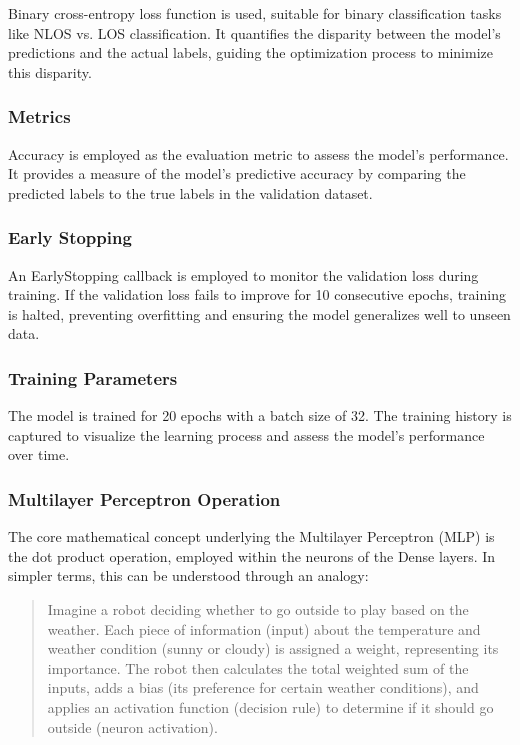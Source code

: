 Binary cross-entropy loss function is used, suitable for binary classification tasks like NLOS vs. LOS classification. It quantifies the disparity between the model's predictions and the actual labels, guiding the optimization process to minimize this disparity.

\subsubsection{Metrics}

Accuracy is employed as the evaluation metric to assess the model's performance. It provides a measure of the model's predictive accuracy by comparing the predicted labels to the true labels in the validation dataset.

\subsubsection{Early Stopping}

An EarlyStopping callback is employed to monitor the validation loss during training. If the validation loss fails to improve for 10 consecutive epochs, training is halted, preventing overfitting and ensuring the model generalizes well to unseen data.

\subsubsection{Training Parameters}

The model is trained for 20 epochs with a batch size of 32. The training history is captured to visualize the learning process and assess the model's performance over time.

\subsubsection{Multilayer Perceptron Operation}

The core mathematical concept underlying the Multilayer Perceptron (MLP) is the dot product operation, employed within the neurons of the Dense layers. In simpler terms, this can be understood through an analogy:

\begin{quote}
Imagine a robot deciding whether to go outside to play based on the weather. Each piece of information (input) about the temperature and weather condition (sunny or cloudy) is assigned a weight, representing its importance. The robot then calculates the total weighted sum of the inputs, adds a bias (its preference for certain weather conditions), and applies an activation function (decision rule) to determine if it should go outside (neuron activation).
\end{quote}

